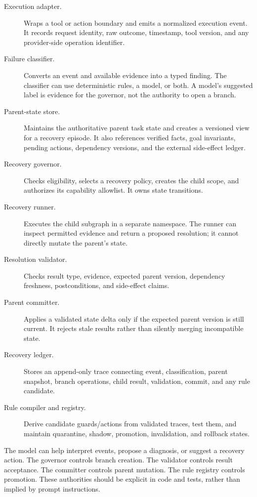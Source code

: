 \begin{description}
  \item[Execution adapter.] Wraps a tool or action boundary and emits a normalized execution event. It records request identity, raw outcome, timestamp, tool version, and any provider-side operation identifier.
  \item[Failure classifier.] Converts an event and available evidence into a typed finding. The classifier can use deterministic rules, a model, or both. A model's suggested label is evidence for the governor, not the authority to open a branch.
  \item[Parent-state store.] Maintains the authoritative parent task state and creates a versioned view for a recovery episode. It also references verified facts, goal invariants, pending actions, dependency versions, and the external side-effect ledger.
  \item[Recovery governor.] Checks eligibility, selects a recovery policy, creates the child scope, and authorizes its capability allowlist. It owns state transitions.
  \item[Recovery runner.] Executes the child subgraph in a separate namespace. The runner can inspect permitted evidence and return a proposed resolution; it cannot directly mutate the parent's state.
  \item[Resolution validator.] Checks result type, evidence, expected parent version, dependency freshness, postconditions, and side-effect claims.
  \item[Parent committer.] Applies a validated state delta only if the expected parent version is still current. It rejects stale results rather than silently merging incompatible state.
  \item[Recovery ledger.] Stores an append-only trace connecting event, classification, parent snapshot, branch operations, child result, validation, commit, and any rule candidate.
  \item[Rule compiler and registry.] Derive candidate guards/actions from validated traces, test them, and maintain quarantine, shadow, promotion, invalidation, and rollback states.
\end{description}

The model can help interpret events, propose a diagnosis, or suggest a recovery action. The governor controls branch creation. The validator controls result acceptance. The committer controls parent mutation. The rule registry controls promotion. These authorities should be explicit in code and tests, rather than implied by prompt instructions.

